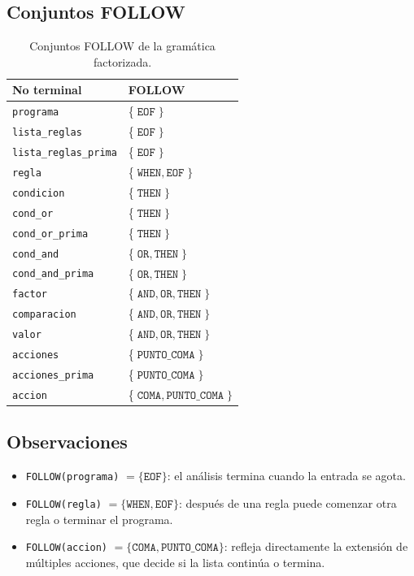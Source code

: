 \documentclass[12pt,a4paper]{article}
\begin{document}
\subsection{Conjuntos FOLLOW}
\begin{table}[h!]
\centering
\begin{tabular}{ll}
\toprule
\textbf{No terminal} & \textbf{FOLLOW} \\
\midrule
\texttt{programa}            & \{$\;\texttt{EOF}\;\}$ \\
\texttt{lista\_reglas}       & \{$\;\texttt{EOF}\;\}$ \\
\texttt{lista\_reglas\_prima}& \{$\;\texttt{EOF}\;\}$ \\
\texttt{regla}               & \{$\;\texttt{WHEN}, \texttt{EOF}\;\}$ \\
\texttt{condicion}           & \{$\;\texttt{THEN}\;\}$ \\
\texttt{cond\_or}            & \{$\;\texttt{THEN}\;\}$ \\
\texttt{cond\_or\_prima}     & \{$\;\texttt{THEN}\;\}$ \\
\texttt{cond\_and}           & \{$\;\texttt{OR}, \texttt{THEN}\;\}$ \\
\texttt{cond\_and\_prima}    & \{$\;\texttt{OR}, \texttt{THEN}\;\}$ \\
\texttt{factor}              & \{$\;\texttt{AND}, \texttt{OR}, \texttt{THEN}\;\}$ \\
\texttt{comparacion}         & \{$\;\texttt{AND}, \texttt{OR}, \texttt{THEN}\;\}$ \\
\texttt{valor}               & \{$\;\texttt{AND}, \texttt{OR}, \texttt{THEN}\;\}$ \\
\texttt{acciones}            & \{$\;\texttt{PUNTO\_COMA}\;\}$ \\
\texttt{acciones\_prima}     & \{$\;\texttt{PUNTO\_COMA}\;\}$ \\
\texttt{accion}              & \{$\;\texttt{COMA}, \texttt{PUNTO\_COMA}\;\}$ \\
\bottomrule
\end{tabular}
\caption{Conjuntos FOLLOW de la gramática factorizada.}
\label{tab:follow}
\end{table}

\subsection{Observaciones}
\begin{itemize}
  \item \texttt{FOLLOW(programa)} $= \{\texttt{EOF}\}$: el análisis termina
        cuando la entrada se agota.
  \item \texttt{FOLLOW(regla)} $= \{\texttt{WHEN}, \texttt{EOF}\}$: después
        de una regla puede comenzar otra regla o terminar el programa.
  \item \texttt{FOLLOW(accion)} $= \{\texttt{COMA},
        \texttt{PUNTO\_COMA}\}$: refleja directamente la extensión de
        múltiples acciones, que decide si la lista continúa o termina.
\end{itemize}
\end{document}
